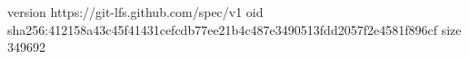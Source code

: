 version https://git-lfs.github.com/spec/v1
oid sha256:412158a43c45f41431cefcdb77ee21b4c487e3490513fdd2057f2e4581f896cf
size 349692
